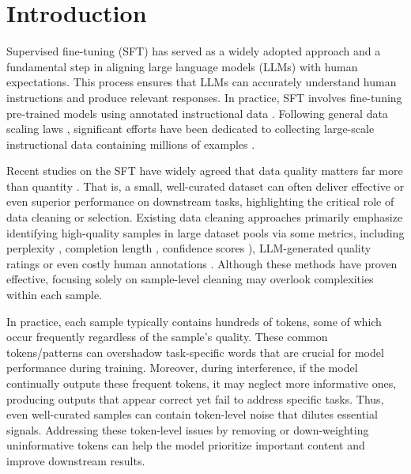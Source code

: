 \section{Introduction}\label{sec:intro}



Supervised fine-tuning (SFT) has served as a widely adopted approach and a fundamental step in aligning large language models (LLMs) with human expectations. This process ensures that LLMs can accurately understand human instructions and produce relevant responses. In practice, SFT involves fine-tuning pre-trained models using annotated instructional data \citep{touvron2023llama}. Following general data scaling laws \citep{zhang2024scaling}, significant efforts have been dedicated to collecting large-scale instructional data containing millions of examples \citep{wang2022self, chung2024scaling, longpre2023flan}. 


Recent studies on the SFT have widely agreed that data quality matters far more than quantity \citep{zhou2024lima, chen2023alpagasus,pang2024improving, liu2023makes}. That is, a small, well-curated dataset can often deliver effective or even superior performance on downstream tasks, highlighting the critical role of data cleaning or selection.
Existing data cleaning approaches primarily emphasize identifying high-quality samples in large dataset pools via some metrics, including perplexity \citep{caoinstruction}, completion length \citep{zhao2024long}, confidence scores \citep{chen2024automated}), LLM-generated quality ratings \citep{chen2023alpagasus, pang2024improving, liu2023makes} or even costly human annotations \citep{zhou2024lima}.
Although these methods have proven effective, focusing solely on sample-level cleaning may overlook complexities within each sample.

In practice, each sample typically contains hundreds of tokens, some of which occur frequently regardless of the sample’s quality. These common tokens/patterns can overshadow task-specific words that are crucial for model performance during training. Moreover, during interference, if the model continually outputs these frequent tokens, it may neglect more informative ones, producing outputs that appear correct yet fail to address specific tasks. Thus, even well-curated samples can contain token-level noise that dilutes essential signals. Addressing these token-level issues by removing or down-weighting uninformative tokens can help the model prioritize important content and improve downstream results.

